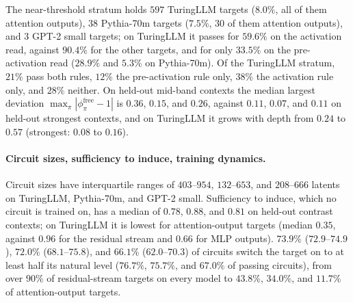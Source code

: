 \documentclass[10pt]{article}
\begin{document}
The near-threshold stratum holds $597$ TuringLLM targets ($8.0\%$, all of them attention outputs), $38$ Pythia-70m targets ($7.5\%$, $30$ of them attention outputs), and $3$ GPT-2 small targets; on TuringLLM it passes for $59.6\%$ on the activation read, against $90.4\%$ for the other targets, and for only $33.5\%$ on the pre-activation read ($28.9\%$ and $5.3\%$ on Pythia-70m).
Of the TuringLLM stratum, $21\%$ pass both rules, $12\%$ the pre-activation rule only, $38\%$ the activation rule only, and $28\%$ neither.
On held-out mid-band contexts the median largest deviation $\max_{\pi} |\phi^{\mathrm{free}}_{\pi} - 1|$ is $0.36$, $0.15$, and $0.26$, against $0.11$, $0.07$, and $0.11$ on held-out strongest contexts, and on TuringLLM it grows with depth from $0.24$ to $0.57$ (strongest: $0.08$ to $0.16$).




\paragraph{Circuit sizes, sufficiency to induce, training dynamics.}
Circuit sizes have interquartile ranges of $403$--$954$, $132$--$653$, and $208$--$666$ latents on TuringLLM, Pythia-70m, and GPT-2 small.
Sufficiency to induce, which no circuit is trained on, has a median of $0.78$, $0.88$, and $0.81$ on held-out contrast contexts; on TuringLLM it is lowest for attention-output targets (median $0.35$, against $0.96$ for the residual stream and $0.66$ for MLP outputs).
$73.9\%$ ($72.9$--$74.9$), $72.0\%$ ($68.1$--$75.8$), and $66.1\%$ ($62.0$--$70.3$) of circuits switch the target on to at least half its natural level ($76.7\%$, $75.7\%$, and $67.0\%$ of passing circuits), from over $90\%$ of residual-stream targets on every model to $43.8\%$, $34.0\%$, and $11.7\%$ of attention-output targets.
\end{document}
